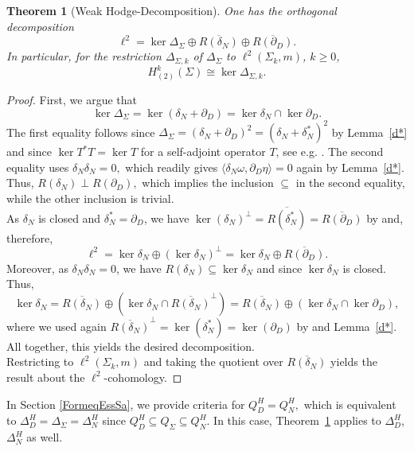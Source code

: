 \documentclass[10pt]{amsart}
\newtheorem{theorem}{Theorem}[section]
\theoremstyle{definition}
\begin{document}
\begin{theorem}[Weak Hodge-Decomposition]\label{kodaira}
	One has the orthogonal decomposition
	$$\ell^2 = \ker\Delta_\Sigma\oplus\overline{R(\delta_N)}\oplus\overline{R(\partial_D)}.$$
	In particular, for the restriction $\Delta_{\Sigma,k}$ of $\Delta_{\Sigma}$ to $\ell^{2}(\Sigma_{k},m)$, $k\ge0$,
	$$H^k_{(2)}(\Sigma)\cong\ker\Delta_{\Sigma,k}.$$
\end{theorem}
\begin{proof}
	First, we argue that $$\ker\Delta_\Sigma =\ker(\delta_N+\partial_D)= \ker\delta_N\cap\ker\partial_D.$$ The first equality follows since $\Delta_\Sigma = (\delta_N+\partial_D)^2 = (\delta_N+\delta_N^*)^2$ by Lemma~\ref{d*} and
	since $\ker T^{*}T=\ker T$ for a self-adjoint operator $ T$, see e.g. \cite[Theorem~5.39]{W}.  The second equality uses $\delta_N\delta_N = 0,$ which readily gives $\langle \delta_{N}\omega,\partial_{D}\eta\rangle=0$ again by Lemma~\ref{d*}. Thus, $R(\delta_{N})\perp R(\partial_{D}),$ which implies the inclusion $\subseteq $ in the second equality, while the other inclusion is trivial. \\
    As $\delta_N$ is closed and $\delta_{N}^{*}=\partial_{D}$, we have $\ker (\delta_{N})^{\perp}=\overline{R(\delta_{N}^{*})}=\overline{R(\partial_{D})}$ by \cite[Theorem~4.13]{W} and, therefore,    
     $$\ell^2 = \ker\delta_N\oplus(\ker\delta_N)^\perp = \ker\delta_N\oplus\overline{R(\partial_D)}.$$ 
     Moreover, as $\delta_N\delta_N = 0$, we have $R(\delta_{N})\subseteq \ker\delta_{N}$ and since $\ker\delta_{N}$ is closed. Thus,
      $$\ker\delta_N = \overline{R(\delta_N)}\oplus (\ker\delta_N\cap\overline{R(\delta_N)}^\perp) = \overline{R(\delta_N)}\oplus(\ker\delta_N\cap\ker\partial_D),$$
      where we used again $ \overline{R(\delta_{N})}^{\perp}=\ker(\delta_{N}^{*})=\ker{(\partial_{D})}$ by \cite[Theorem~4.13]{W} and Lemma~\ref{d*}.
    All together, this yields the desired decomposition.\\
    Restricting to $\ell^2(\Sigma_k,m)$ and taking the quotient over $\overline{R(\delta_N)}$ yields the result about the $\ell^2$-cohomology.
    \end{proof}

In Section \ref{FormeqEssSa}, we provide criteria for $Q^{H}_{D}=Q^{H}_{N},$ which is equivalent to $\Delta_{D}^{H}=\Delta_{\Sigma}=\Delta_{N}^{H}$ since $Q_{D}^{H}\subseteq Q_{\Sigma}\subseteq Q_{N}^{H}$. In this case,  Theorem~\ref{kodaira} applies to $\Delta_{D}^{H}$, $\Delta_{N}^{H}$ as well.\\
\end{document}
